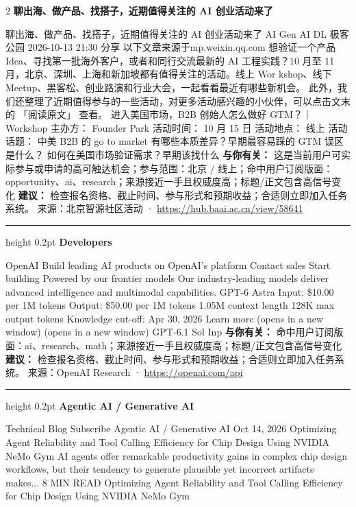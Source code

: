 \documentclass[10.5pt]{ctexart}
\begin{document}
\begin{multicols}{2}
{\large\bfseries 聊出海、做产品、找搭子，近期值得关注的 AI 创业活动来了}\par
聊出海、做产品、找搭子，近期值得关注的 AI 创业活动来了 AI Gen AI DL 极客公园 2026-10-13 21:30 分享 以下文章来源于mp.weixin.qq.com 想验证一个产品 Idea、寻找第一批海外客户，或者和同行交流最新的 AI 工程实践？10 月至 11 月，北京、深圳、上海和新加坡都有值得关注的活动。线上 Wor kshop、线下 Meetup、黑客松、创业路演和行业大会，一起看看最近有哪些新机会。 此外，我们还整理了近期值得参与的一些活动，对更多活动感兴趣的小伙伴，可以点击文末的 「阅读原文」 查看。 进入美国市场，B2B 创始人怎么做好 GTM？｜Workshop 主办方： Founder Park 活动时间： 10 月 15 日 活动地点： 线上 活动话题： 中美 B2B 的 go to market 有哪些本质差异？早期最容易踩的 GTM 误区是什么？ 如何在美国市场验证需求？早期该找什么
\textbf{与你有关：} 这是当前用户可实际参与或申请的高可触达机会；参与范围：北京 / 线上；命中用户订阅版面：opportunity、ai、research；来源接近一手且权威度高；标题/正文包含高信号变化
\textbf{建议：} 检查报名资格、截止时间、参与形式和预期收益；合适则立即加入任务系统。
{\footnotesize\color{ormuted} 来源：北京智源社区活动 · \url{https://hub.baai.ac.cn/view/58641}}
\vspace{2mm}
\hrule height 0.2pt
\vspace{2mm}
{\large\bfseries Developers}\par
OpenAI Build leading AI products on OpenAI’s platform Contact sales Start building Powered by our frontier models Our industry-leading models deliver advanced intelligence and multimodal capabilities. GPT-6 Astra Input: \$10.00 per 1M tokens Output: \$50.00 per 1M tokens 1.05M context length 128K max output tokens Knowledge cut-off: Apr 30, 2026 Learn more (opens in a new window) (opens in a new window) GPT-6.1 Sol Inp
\textbf{与你有关：} 命中用户订阅版面：ai、research、math；来源接近一手且权威度高；标题/正文包含高信号变化
\textbf{建议：} 检查报名资格、截止时间、参与形式和预期收益；合适则立即加入任务系统。
{\footnotesize\color{ormuted} 来源：OpenAI Research · \url{https://openai.com/api}}
\vspace{2mm}
\hrule height 0.2pt
\vspace{2mm}
{\large\bfseries Agentic AI / Generative AI}\par
Technical Blog Subscribe Agentic AI / Generative AI Oct 14, 2026 Optimizing Agent Reliability and Tool Calling Efficiency for Chip Design Using NVIDIA NeMo Gym AI agents offer remarkable productivity gains in complex chip design workflows, but their tendency to generate plausible yet incorrect artifacts makes... 8 MIN READ Optimizing Agent Reliability and Tool Calling Efficiency for Chip Design Using NVIDIA NeMo Gym 

\end{multicols}
\end{document}

